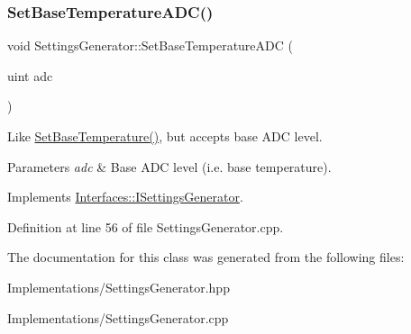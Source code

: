 \mbox{\label{class_settings_generator_a806478b651a98ce128e97c2da385c302}} 
\subsubsection{\texorpdfstring{Set\+Base\+Temperature\+A\+D\+C()}{SetBaseTemperatureADC()}}
{\footnotesize\ttfamily void Settings\+Generator\+::\+Set\+Base\+Temperature\+A\+DC (\begin{DoxyParamCaption}\item[{uint}]{adc }\end{DoxyParamCaption})\hspace{0.3cm}{\ttfamily [virtual]}}



Like \hyperlink{class_settings_generator_aed9e7acb30bfd559b1ac70ceeddd8973}{Set\+Base\+Temperature()}, but accepts base A\+DC level. 


\begin{DoxyParams}{Parameters}
{\em adc} & Base A\+DC level (i.\+e. base temperature). \\
\hline
\end{DoxyParams}


Implements \hyperlink{class_interfaces_1_1_i_settings_generator_af681d36295e95bd52cbfd1bbc3ae8cf9}{Interfaces\+::\+I\+Settings\+Generator}.



Definition at line 56 of file Settings\+Generator.\+cpp.



The documentation for this class was generated from the following files\+:\begin{DoxyCompactItemize}
\item 
Implementations/Settings\+Generator.\+hpp\item 
Implementations/Settings\+Generator.\+cpp\end{DoxyCompactItemize}
